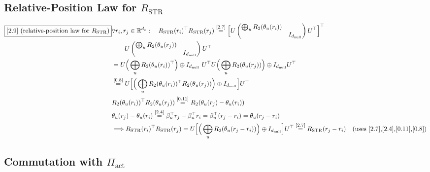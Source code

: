\documentclass[11pt]{article}
\newcommand{\eqref}[1]{\overset{[#1]}{=}}
\begin{document}
\subsection{Relative-Position Law for $R_{\mathrm{STR}}$}

\begin{align}
\boxed{[2.9] \text{ (relative-position law for }R_{\mathrm{STR}})}
&\forall r_i,r_j\in\mathbb{R}^{d_c}:\quad
R_{\mathrm{STR}}(r_i)^\top
R_{\mathrm{STR}}(r_j)
\eqref{2.7}
\Big[
U
\begin{pmatrix}
\bigoplus_u R_2(\theta_u(r_i))\\
& I_{d_{\mathrm{null}}}
\end{pmatrix}
U^\top
\Big]^\top \notag\\
&\quad\quad U
\begin{pmatrix}
\bigoplus_u R_2(\theta_u(r_j))\\
& I_{d_{\mathrm{null}}}
\end{pmatrix}
U^\top \notag\\
&=
U
\Big(
\bigoplus_u R_2(\theta_u(r_i))^\top
\Big)
\oplus
I_{d_{\mathrm{null}}}
\
U^\top U
\Big(
\bigoplus_u R_2(\theta_u(r_j))
\Big)
\oplus
I_{d_{\mathrm{null}}}
U^\top \notag\\
&\eqref{0.8}
U
\Big[
\Big(
\bigoplus_u
R_2(\theta_u(r_i))^\top
R_2(\theta_u(r_j))
\Big)
\oplus
I_{d_{\mathrm{null}}}
\Big]
U^\top \notag\\
&R_2(\theta_u(r_i))^\top
R_2(\theta_u(r_j))
\eqref{0.11}
R_2(\theta_u(r_j)-\theta_u(r_i)) \notag\\
&\theta_u(r_j)-\theta_u(r_i)
\eqref{2.4}
\beta_u^\top r_j - \beta_u^\top r_i
=
\beta_u^\top(r_j-r_i)
=
\theta_u(r_j-r_i) \notag\\
&\Longrightarrow
R_{\mathrm{STR}}(r_i)^\top
R_{\mathrm{STR}}(r_j)
=
U
\Big[
\Big(
\bigoplus_u
R_2(\theta_u(r_j-r_i))
\Big)
\oplus
I_{d_{\mathrm{null}}}
\Big]
U^\top
\eqref{2.7}
R_{\mathrm{STR}}(r_j-r_i)
\quad(\text{uses [2.7],[2.4],[0.11],[0.8]})
\end{align}

\subsection{Commutation with $\Pi_{\mathrm{act}}$}
\end{document}
